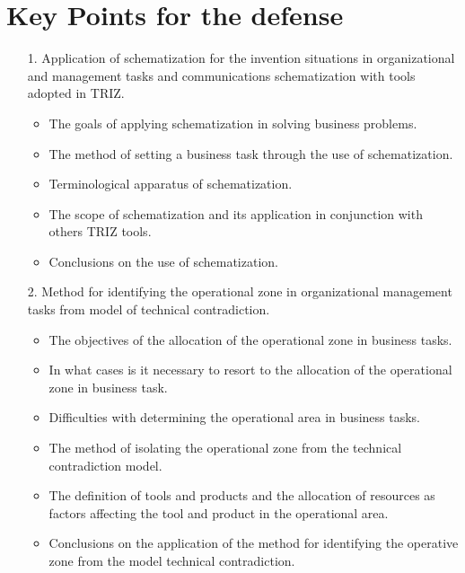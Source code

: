 \section{Key Points for the defense}
\begin{itemize}
\item[1.] Application of schematization for the invention situations in
  organizational and management tasks and communications schematization with
  tools adopted in TRIZ.
\begin{itemize}
\item The goals of applying schematization in solving business problems.
\item The method of setting a business task through the use of schematization.
\item Terminological apparatus of schematization.
\item The scope of schematization and its application in conjunction with
  others TRIZ tools.
\item Conclusions on the use of schematization.
\end{itemize}
\item[2.] Method for identifying the operational zone in organizational
  management tasks from model of technical contradiction.
\begin{itemize}
\item The objectives of the allocation of the operational zone in business
  tasks.
\item In what cases is it necessary to resort to the allocation of the
  operational zone in business task.
\item Difficulties with determining the operational area in business tasks.
\item The method of isolating the operational zone from the technical
  contradiction model.
\item The definition of tools and products and the allocation of resources as
  factors affecting the tool and product in the operational area.
\item Conclusions on the application of the method for identifying the
  operative zone from the model technical contradiction.
\end{itemize}
\end{itemize}

